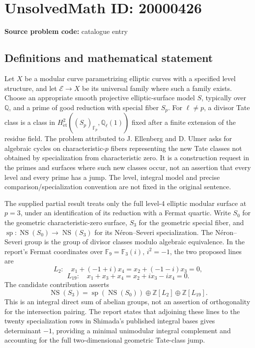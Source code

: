 \documentclass[11pt]{article}
\newcommand{\Z}{\mathbb{Z}}
\newcommand{\Q}{\mathbb{Q}}
\newcommand{\F}{\mathbb{F}}
\begin{document}
\section*{UnsolvedMath ID: 20000426}
\textbf{Source problem code:} catalogue entry
\subsection{Definitions and mathematical statement}
Let \(X\) be a modular curve parametrizing elliptic curves with a specified level structure, and let \(\mathcal E\to X\) be its universal family where such a family exists. Choose an appropriate smooth projective elliptic-surface model \(S\), typically over \(\Q\), and a prime of good reduction with special fiber \(S_p\). For \(\ell\ne p\), a divisor Tate class is a class in \(H^2_{\mathrm{\acute et}}((S_p)_{\overline{\F}_p},\Q_\ell(1))\) fixed after a finite extension of the residue field. The problem attributed to J. Ellenberg and D. Ulmer asks for algebraic cycles on characteristic-\(p\) fibers representing the new Tate classes not obtained by specialization from characteristic zero. It is a construction request in the primes and surfaces where such new classes occur, not an assertion that every level and every prime has a jump. The level, integral model and precise comparison/specialization convention are not fixed in the original sentence.

The supplied partial result treats only the full level-4 elliptic modular surface at \(p=3\), under an identification of its reduction with a Fermat quartic. Write \(S_0\) for the geometric characteristic-zero surface, \(S_3\) for the geometric special fiber, and \(\operatorname{sp}:\operatorname{NS}(S_0)\to\operatorname{NS}(S_3)\) for its N\'eron--Severi specialization. The N\'eron--Severi group is the group of divisor classes modulo algebraic equivalence. In the report's Fermat coordinates over \(\F_9=\F_3(i)\), \(i^2=-1\), the two proposed lines are
\[
 L_2:\quad x_1+(-1+i)x_4=x_2+(-1-i)x_3=0,
\]
\[
 L_{19}:\quad x_1+x_3+x_4=x_2+i x_3-i x_4=0.
\]
The candidate contribution asserts
\[
 \operatorname{NS}(S_3)=\operatorname{sp}(\operatorname{NS}(S_0))
 \oplus\Z[L_2]\oplus\Z[L_{19}].
\]
This is an integral direct sum of abelian groups, not an assertion of orthogonality for the intersection pairing. The report states that adjoining these lines to the twenty specialization rows in Shimada's published integral bases gives determinant \(-1\), providing a minimal unimodular integral complement and accounting for the full two-dimensional geometric Tate-class jump.
\end{document}
